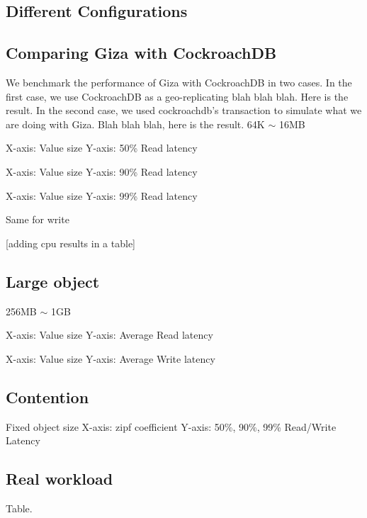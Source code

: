 \subsection {Different Configurations}
\subsection{Comparing Giza with CockroachDB}

We benchmark the performance of Giza with CockroachDB in two cases. In the first case, we use CockroachDB as a geo-replicating blah blah blah. Here is the result.
In the second case, we used cockroachdb's transaction to simulate what we are doing with Giza. Blah blah blah, here is the result.
64K $\sim$ 16MB

X-axis: Value size
Y-axis: 50\% Read latency

X-axis: Value size
Y-axis: 90\% Read latency

X-axis: Value size
Y-axis: 99\% Read latency

Same for write

[adding cpu results in a table]

\subsection{Large object}
256MB $\sim$ 1GB

X-axis: Value size
Y-axis: Average Read latency

X-axis: Value size
Y-axis: Average Write latency


\subsection{Contention}

Fixed object size
X-axis: zipf coefficient
Y-axis: 50\%, 90\%, 99\% Read/Write Latency


\subsection{Real workload}
Table.